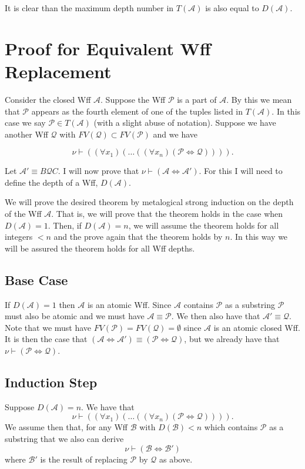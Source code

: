 \documentclass[12pt]{article}
\theoremstyle{break}
\theoremstyle{break}
\theoremstyle{break}
\theoremstyle{break}
\newcommand{\mc}[1]{\mathcal{#1}}
\begin{document}
It is clear than the maximum depth number in $T(\mc{A})$ is also equal to $D(\mc{A})$.

\newpage

\section{Proof for Equivalent Wff Replacement}

Consider the closed Wff $\mc{A}$.
Suppose the Wff $\mc{P}$ is a part of $\mc{A}$. By this we mean that $\mc{P}$ appears as the fourth element of one of the tuples listed in $T(\mc{A})$. In this case we say $\mc{P} \in T(\mc{A})$ (with a slight abuse of notation).
Suppose we have another Wff $\mc{Q}$ with $FV(\mc{Q}) \subset FV(\mc{P})$ and we have

$$
\nu \vdash ((\forall x_1)(\ldots((\forall x_n) (\mc{P} \iff \mc{Q})))).
$$

Let $\mc{A}' \equiv B\mc{Q}C$. I will now prove that $\nu \vdash (\mc{A} \iff \mc{A}')$. 
For this I will need to define the depth of a Wff, $D(\mc{A})$.



We will prove the desired theorem by metalogical strong induction on the depth of the Wff $\mc{A}$.
That is, we will prove that the theorem holds in the case when $D(\mc{A}) = 1$.
Then, if $D(\mc{A}) = n$, we will assume the theorem holds for all integers $<n$ and the prove again that the theorem holds by $n$. 
In this way we will be assured the theorem holds for all Wff depths.

\subsection*{Base Case}

If $D(\mc{A}) = 1$ then $\mc{A}$ is an atomic Wff.
Since $\mc{A}$ contains $\mc{P}$ as a substring $\mc{P}$ must also be atomic and we must have $\mc{A} \equiv \mc{P}$.
We then also have that $\mc{A}' \equiv \mc{Q}$.
Note that we must have $FV(\mc{P}) = FV(\mc{Q}) = \emptyset$ since $\mc{A}$ is an atomic closed Wff.
It is then the case that $(\mc{A} \iff \mc{A}') \equiv (\mc{P} \iff \mc{Q})$, but we already have that $\nu \vdash (\mc{P} \iff \mc{Q})$.

\subsection*{Induction Step}

Suppose $D(\mc{A}) = n$.
We have that 
$$
\nu \vdash ((\forall x_1)(\ldots((\forall x_n) (\mc{P} \iff \mc{Q})))).
$$
We assume then that, for any Wff $\mc{B}$ with $D(\mc{B}) < n$ which contains $\mc{P}$ as a substring that we also can derive
$$
\nu \vdash (\mc{B} \iff \mc{B}')
$$
where $\mc{B}'$ is the result of replacing $\mc{P}$ by $\mc{Q}$ as above.
\end{document}

